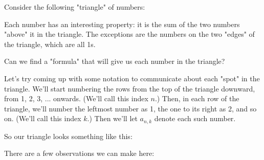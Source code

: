 
Consider the following "triangle" of numbers:


Each number has an interesting property: it is the sum of the two numbers "above" it in the triangle. The exceptions are the numbers on the two "edges" of the triangle, which are all 1s.

Can we find a "formula" that will give us each number in the triangle?



Let's try coming up with some notation to communicate about each "spot" in the triangle. We'll start numbering the rows from the top of the triangle downward, from 1, 2, 3, ... onwards. (We'll call this index $n$.) Then, in each row of the triangle, we'll number the leftmost number as 1, the one to its right as 2, and so on. (We'll call this index $k$.) Then we'll let $a_{n,k}$ denote each such number.

So our triangle looks something like this:


There are a few observations we can make here:


